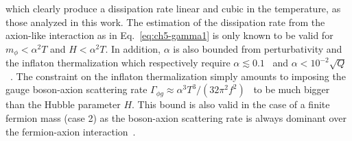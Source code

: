 which clearly produce a dissipation rate linear and cubic in the temperature, as those analyzed in this work. The estimation of the dissipation rate from the axion-like interaction as in Eq.~\ref{eq:ch5-gamma1} is only known to be valid for $m_{\phi} < \alpha^2 T$ and $H < \alpha^2 T$. In addition, $\alpha$ is also bounded from perturbativity and the inflaton thermalization which respectively require $\alpha\lesssim 0.1$~\cite{Moore:2010jd} and $\alpha < 10^{-2}\sqrt{Q}$~\cite{Berghaus:2019whh}. The constraint on the inflaton thermalization simply amounts to imposing the gauge boson-axion scattering rate $\Gamma_{\phi g}\approx \alpha^3 T^3/(32\pi^2 f^2)$~\cite{Masso:2002np,Graf:2010tv} to be much bigger than the Hubble parameter $H$. This bound is also valid in the case of a finite fermion mass (case 2) as the boson-axion scattering rate is always dominant over the fermion-axion interaction~\cite{Berghaus:2020ekh}.

